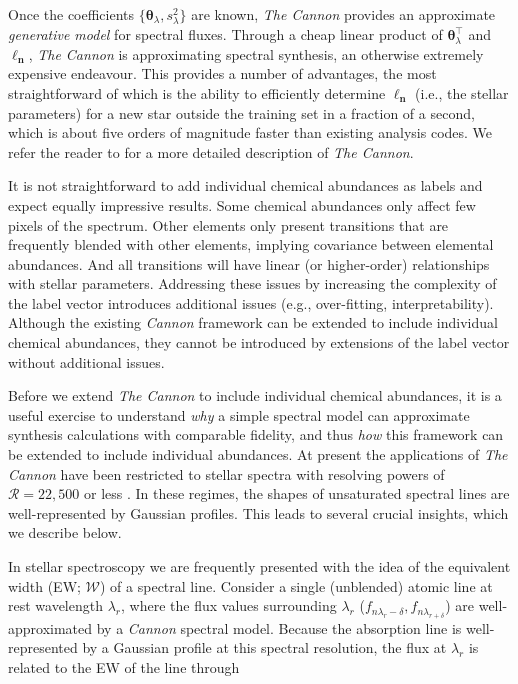 \documentclass[useAMS,usenatbib]{mn2e}
\newcommand\tc{\textit{The Cannon}}
\newcommand\lv{\mathbf{\boldsymbol\ell_n}}
\newcommand\cv{{\boldsymbol\theta}_\lambda}
\newcommand\ssq{s_\lambda^2}
\begin{document}
Once the coefficients $\{\cv,\ssq\}$ are known, \tc{} provides an approximate
\textit{generative model} for spectral fluxes. Through a cheap linear product of
$\cv^\intercal$ and $\lv$, \tc{} is approximating spectral synthesis, an 
otherwise extremely expensive endeavour. This provides a number of advantages,
the most straightforward of which is the ability to efficiently determine $\lv$
(i.e., the stellar parameters) for a new star outside the training set in a
fraction of a second, which is about five orders of magnitude faster than
existing analysis codes. We refer the reader to \citet{Ness15a} for a more
detailed description of \tc{}. 

It is not straightforward to add individual chemical abundances as labels and
expect equally impressive results.  Some chemical abundances only affect few
pixels of the spectrum. Other elements only present transitions that are
frequently blended with other elements, implying covariance between elemental
abundances.  And all transitions will have linear (or higher-order) 
relationships with stellar parameters.  Addressing these issues by increasing
the complexity of the label vector introduces additional issues (e.g.,
over-fitting, interpretability).  Although the existing \textit{Cannon}
framework can be extended to include individual chemical abundances, they cannot
be introduced by extensions of the label vector without additional issues.

Before we extend \tc{} to include individual chemical abundances, it is a useful
 exercise to understand \textit{why} a simple spectral model can 
approximate synthesis calculations with comparable fidelity, and thus 
\textit{how} this framework can be extended to include individual abundances. At
present the applications of \tc{} have been restricted to stellar spectra with 
resolving powers of $\mathcal{R} = 22,500$ \citep[APOGEE;][]{Ness15a} or less 
\citep[e.g., LAMOST;][]{Ho15}. In these regimes, the shapes of unsaturated 
spectral lines are well-represented by Gaussian profiles. This leads to several 
crucial insights, which we describe below.

In stellar spectroscopy we are frequently presented with the idea of the 
equivalent width (EW; $\mathcal{W}$) of a spectral line. Consider a single 
(unblended) atomic line at rest wavelength $\lambda_r$, where the flux values 
surrounding $\lambda_r$ ($f_{n\lambda_r-{\delta}},f_{n\lambda_{r+\delta}}$) are 
well-approximated by a \textit{Cannon} spectral model. Because the absorption 
line is well-represented by a Gaussian profile at this spectral resolution, the 
flux at $\lambda_r$ is related to the EW of the line through
\end{document}
